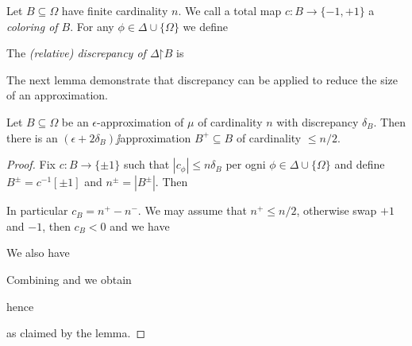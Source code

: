 \documentclass[creche.tex]{subfiles}
\begin{document}
Let $B\subseteq\Omega$ have finite cardinality $n$. We call a total map $c:B\to\{-1,+1\}$ a \emph{coloring of $B$}. For any $\phi\in\Delta\cup\{\Omega\}$ we define


The \emph{(relative) discrepancy of $\Delta\mathord\restriction B$\/} is 


The next lemma demonstrate that discrepancy can be applied to reduce the size of an approximation. 

\begin{lemma}\label{lem_aprossimazionediapprossimazione}
Let $B\subseteq\Omega$ be an $\epsilon$-approximation of $\mu$ of cardinality $n$ with discrepancy $\delta_B$. Then there is an $(\epsilon+2\delta_B)\jj$approximation $B^+\subseteq B$ of cardinality $\le n/2$.
\end{lemma}

\begin{proof}
Fix $c:B\to\{\pm1\}$ such that $|c_\phi|\le n\delta_B$ per ogni $\phi\in\Delta\cup\{\Omega\}$ and define $B^\pm=c^{-1}[\pm1]$ and  $n^\pm=|B^\pm|$. Then 


In particular $c_B=n^+-n^-$. We may assume that $n^+\le n/2$, otherwise swap $+1$ and $-1$, then $c_B<0$ and we have 



We also have 





Combining  and  we obtain 


hence


as claimed by the lemma.
\end{proof}
\end{document}
